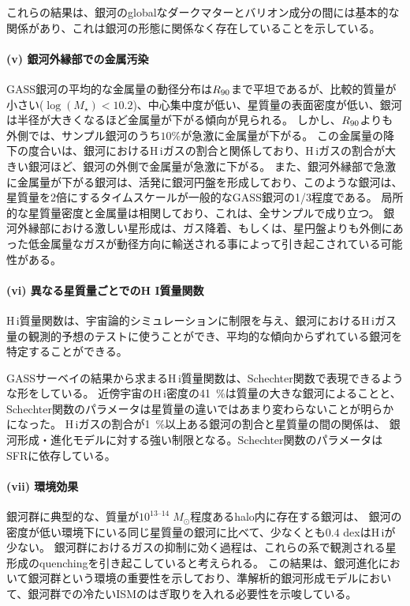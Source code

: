 これらの結果は、銀河のglobalなダークマターとバリオン成分の間には基本的な関係があり、これは銀河の形態に関係なく存在していることを示している。


\paragraph{(v) 銀河外縁部での金属汚染 \citep{2012ApJ...745...66M}}

GASS銀河の平均的な金属量の動径分布は$R_{\rm 90}$まで平坦であるが、比較的質量が小さい($\log{(M_\star)}<10.2$)、中心集中度が低い、星質量の表面密度が低い、銀河は半径が大きくなるほど金属量が下がる傾向が見られる。
しかし、$R_{\rm 90}$よりも外側では、サンプル銀河のうち$10$\%が急激に金属量が下がる。
この金属量の降下の度合いは、銀河におけるH\,{\sc i}ガスの割合と関係しており、H\,{\sc i}ガスの割合が大きい銀河ほど、銀河の外側で金属量が急激に下がる。
また、銀河外縁部で急激に金属量が下がる銀河は、活発に銀河円盤を形成しており、このような銀河は、星質量を2倍にするタイムスケールが一般的なGASS銀河の1/3程度である。
局所的な星質量密度と金属量は相関しており、これは、全サンプルで成り立つ。
銀河外縁部における激しい星形成は、ガス降着、もしくは、星円盤よりも外側にあった低金属量なガスが動径方向に輸送される事によって引き起こされている可能性がある。


\paragraph{(vi) 異なる星質量ごとでのH I質量関数 \citep{2013ApJ...776...74L}}

H\,{\sc i}質量関数は、宇宙論的シミュレーションに制限を与え、銀河におけるH\,{\sc i}ガス量の観測的予想のテストに使うことができ、平均的な傾向からずれている銀河を特定することができる。

GASSサーベイの結果から求まるH\,{\sc i}質量関数は、Schechter関数で表現できるような形をしている。
近傍宇宙のH\,{\sc i}密度の41~\%は質量の大きな銀河によることと、
Schechter関数のパラメータは星質量の違いではあまり変わらないことが明らかになった。
H\,{\sc i}ガスの割合が1~\%以上ある銀河の割合と星質量の間の関係は、
銀河形成・進化モデルに対する強い制限となる。Schechter関数のパラメータはSFRに依存している。


\paragraph{(vii) 環境効果 \citep{2013MNRAS.436...34C}}

銀河群に典型的な、質量が$10^{13\mbox{--}14}\; M_\odot$程度あるhalo内に存在する銀河は、
銀河の密度が低い環境下にいる同じ星質量の銀河に比べて、少なくとも$0.4$ dexはH\,{\sc i}が少ない。
銀河群におけるガスの抑制に効く過程は、これらの系で観測される星形成のquenchingを引き起こしていると考えられる。
この結果は、銀河進化において銀河群という環境の重要性を示しており、準解析的銀河形成モデルにおいて、銀河群での冷たいISMのはぎ取りを入れる必要性を示唆している。


